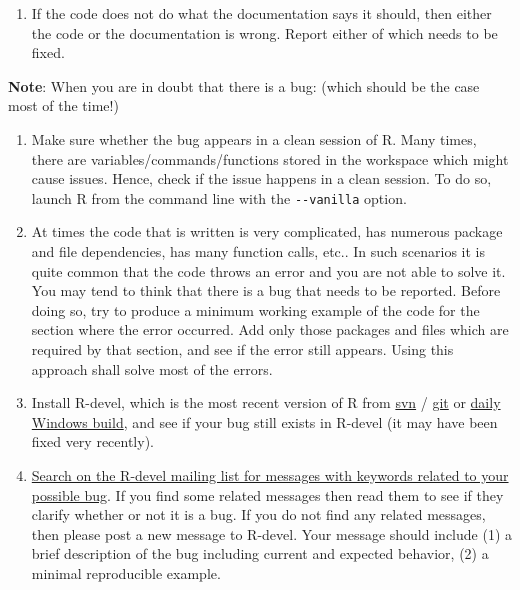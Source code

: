 \documentclass[
]{book}
\providecommand{\tightlist}{%
  \setlength{\itemsep}{0pt}\setlength{\parskip}{0pt}}
\begin{document}
\begin{enumerate}
\def\labelenumi{\arabic{enumi}.}
\setcounter{enumi}{1}
\tightlist
\item
  If the code does not do what the documentation says it should, then either the code or the documentation is wrong. Report either of which needs to be fixed.
\end{enumerate}

\textbf{Note}:
When you are in doubt that there is a bug: (which should be the case most of the time!)

\begin{enumerate}
\def\labelenumi{\arabic{enumi}.}
\item
  Make sure whether the bug appears in a clean session of R. Many times, there are variables/commands/functions stored in the workspace which might cause issues. Hence, check if the issue happens in a clean session. To do so, launch R from the command line with the \texttt{-\/-vanilla} option.
\item
  At times the code that is written is very complicated, has numerous package and file dependencies, has many function calls, etc.. In such scenarios it is quite common that the code throws an error and you are not able to solve it. You may tend to think that there is a bug that needs to be reported. Before doing so, try to produce a minimum working example of the code for the section where the error occurred. Add only those packages and files which are required by that section, and see if the error still appears. Using this approach shall solve most of the errors.
\item
  Install R-devel, which is the most recent version of R from \href{https://svn.r-project.org/R/trunk/}{svn} / \href{https://github.com/r-devel/r-svn}{git} or \href{https://cran.r-project.org/bin/windows/base/rdevel.html}{daily Windows build}, and see if your bug still exists in R-devel (it may have been fixed very recently).
\item
  \href{https://r.789695.n4.nabble.com/template/NamlServlet.jtp?macro=search_page\&node=909078\&query=isna\&days=0}{Search on the R-devel mailing list for messages with keywords related to your possible bug}. If you find some related messages then read them to see if they clarify whether or not it is a bug. If you do not find any related messages, then please post a new message to R-devel. Your message should include (1) a brief description of the bug including current and expected behavior, (2) a minimal reproducible example.
\end{enumerate}
\end{document}
